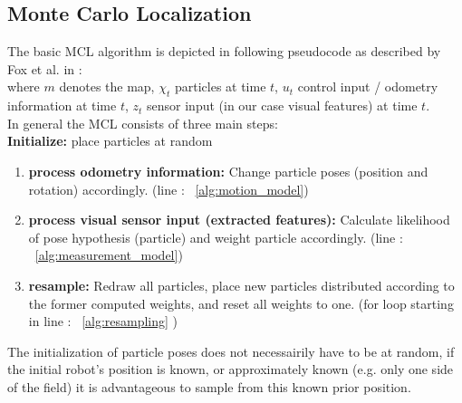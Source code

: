 \documentclass[	DIV=calc,%
							paper=a4,%
							fontsize=9pt,%
							twocolumn]{scrartcl}	 					%
\begin{document}
\subsection{Monte Carlo Localization}
\label{sec:MCL}
The basic MCL algorithm is depicted in following pseudocode  as described by Fox et al. in \cite{MonteCarloLocalization}:\\

where $m$ denotes the map, $\chi_t$ particles at time $t$, $u_t$ control input / odometry information at time $t$, $z_t$ sensor input (in our case visual features) at time $t$.
\\
In general the MCL consists of three main steps:\\
\textbf{Initialize:} place particles at random
\begin{enumerate}
\item \textbf{process odometry information:} Change particle poses (position and rotation) accordingly. (line : ~\ref{alg:motion_model})
\item \textbf{process visual sensor input (extracted features):} Calculate likelihood of pose hypothesis (particle) and weight particle accordingly. (line : ~\ref{alg:measurement_model})
\item \textbf{resample:} Redraw all particles, place new particles distributed according to the former computed weights, and reset all weights to one. (for loop starting in line : ~\ref{alg:resampling} ) %
\end{enumerate}
The initialization of particle poses does not necessairily have to be at random, if the initial robot's position is known, or approximately known (e.g. only one side of the field) it is advantageous to sample from this known prior position.\\
\end{document}
